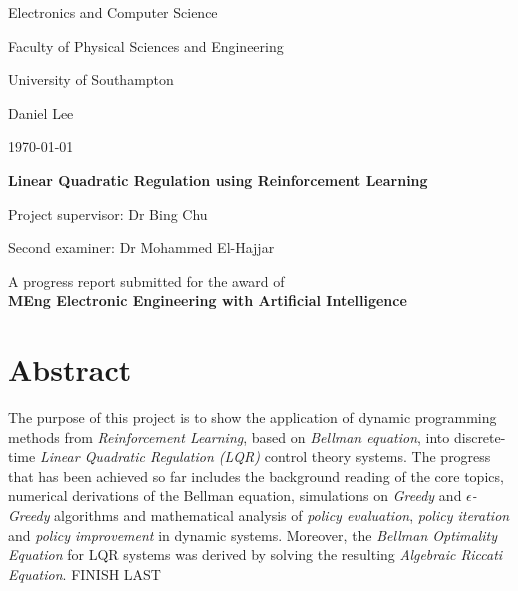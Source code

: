 \documentclass[a4paper]{article}
\begin{document}
	
	\begin{titlepage}
		\vspace*{\fill}
		\begin{center}
		\centering
		{\Huge Electronics and Computer Science \par}
		{\Huge Faculty of Physical Sciences and Engineering \par}
		{\Huge University of Southampton \par}
		\hfill \break
		{\Large Daniel Lee \par}
		{\Large \today \par}
		\hfill \break
		{\huge\bfseries Linear Quadratic Regulation using Reinforcement Learning \par}
		\hfill \break
		{\Large Project supervisor: Dr Bing Chu \par}
		{\Large Second examiner: Dr Mohammed El-Hajjar \par}
		\hfill \break
		{\large A progress report submitted for the award of \\
			\bfseries MEng Electronic Engineering with Artificial Intelligence \par}
		\end{center}
		\vspace*{\fill}
	\end{titlepage}
	\pagebreak
	\setcounter{page}{2}
	
	\section*{Abstract}
	The purpose of this project is to show the application of dynamic programming methods from \textit{Reinforcement Learning}, based on \textit{Bellman equation}, into discrete-time \textit{Linear Quadratic Regulation (LQR)} control theory systems. The progress that has been achieved so far includes the background reading of the core topics, numerical derivations of the Bellman equation, simulations on \textit{Greedy} and \textit{$\epsilon$-Greedy} algorithms and mathematical analysis of \textit{policy evaluation}, \textit{policy iteration} and \textit{policy improvement} in dynamic systems. Moreover, the \textit{Bellman Optimality Equation} for LQR systems was derived by solving the resulting \textit{Algebraic Riccati Equation}. FINISH LAST \par
	
	\pagebreak
	
	\tableofcontents
	
\end{document}
